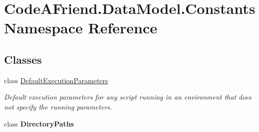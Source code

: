 \hypertarget{namespace_code_a_friend_1_1_data_model_1_1_constants}{}\section{Code\+A\+Friend.\+Data\+Model.\+Constants Namespace Reference}
\label{namespace_code_a_friend_1_1_data_model_1_1_constants}
\subsection*{Classes}
\begin{DoxyCompactItemize}
\item 
class \mbox{\hyperlink{class_code_a_friend_1_1_data_model_1_1_constants_1_1_default_execution_parameters}{Default\+Execution\+Parameters}}
\begin{DoxyCompactList}\small\item\em Default execution parameters for any script running in an environment that does not specify the running parameters. \end{DoxyCompactList}\item 
class {\bfseries Directory\+Paths}
\end{DoxyCompactItemize}
